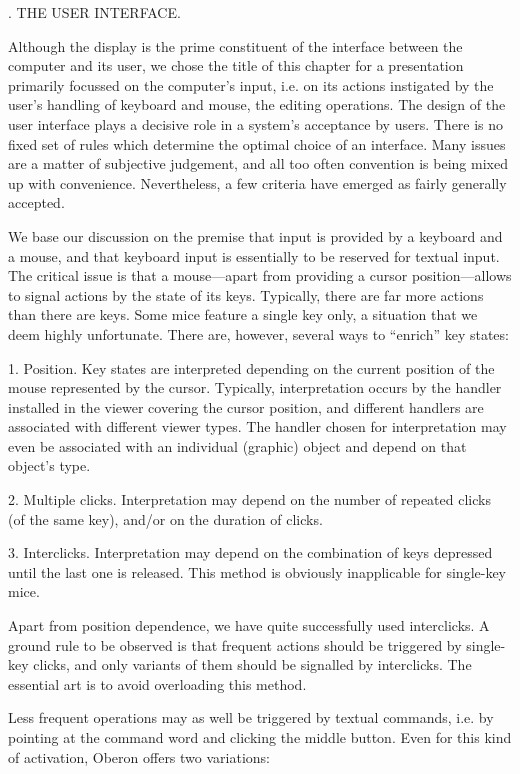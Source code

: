 . THE USER INTERFACE.

Although the display is the prime constituent of the interface between the computer and its user, we chose the title of this chapter for a presentation primarily focussed on the computer's input, i.e. on its actions instigated by the user's handling of keyboard and mouse, the editing operations. The design of the user interface plays a decisive role in a system's acceptance by users. There is no fixed set of rules which determine the optimal choice of an interface. Many issues are a matter of subjective judgement, and all too often convention is being mixed up with convenience. Nevertheless, a few criteria have emerged as fairly generally accepted.

We base our discussion on the premise that input is provided by a keyboard and a mouse, and that keyboard input is essentially to be reserved for textual input. The critical issue is that a mouse---apart from providing a cursor position---allows to signal actions by the state of its keys. Typically, there are far more actions than there are keys. Some mice feature a single key only, a situation that we deem highly unfortunate. There are, however, several ways to ``enrich'' key states:

\item{1.} Position. Key states are interpreted depending on the current position of the mouse represented by the cursor. Typically, interpretation occurs by the handler installed in the viewer covering the cursor position, and different handlers are associated with different viewer types. The handler chosen for interpretation may even be associated with an individual (graphic) object and depend on that object's type.
\item{2.} Multiple clicks. Interpretation may depend on the number of repeated clicks (of the same key), and/or on the duration of clicks.
\item{3.} Interclicks. Interpretation may depend on the combination of keys depressed until the last one is released. This method is obviously inapplicable for single-key mice.

Apart from position dependence, we have quite successfully used interclicks. A ground rule to be observed is that frequent actions should be triggered by single-key clicks, and only variants of them should be signalled by interclicks. The essential art is to avoid overloading this method.

Less frequent operations may as well be triggered by textual commands, i.e. by pointing at the command word and clicking the middle button. Even for this kind of activation, Oberon offers two variations:

